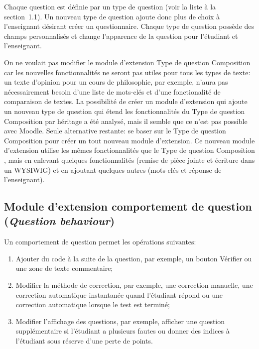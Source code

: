 Chaque question est définie par un type de question (voir la liste à la section~1.1).
Un nouveau type de question ajoute donc plus de choix à l'enseignant désirant créer un questionnaire.
Chaque type de question possède des champs personnalisés et change l'apparence de la question pour l'étudiant et l'enseignant.

On ne voulait pas modifier le module d'extension \og Type de question Composition \fg{} car les nouvelles fonctionnalités ne seront pas utiles pour tous les types de texte: un texte d'opinion pour un cours de philosophie, par exemple, n'aura pas n\'ecessairement besoin d'une liste de mots-clés et d'une fonctionalit\'e de comparaison de textes.
La possibilité de créer un module d'extension qui ajoute un nouveau type de question qui étend les fonctionnalités du \og Type de question Composition \fg{} par héritage a été analysé, mais il semble que ce n'est pas possible avec Moodle.
Seule alternative restante: se baser sur le \og Type de question Composition \fg{} pour créer un tout nouveau module d'extension.
Ce nouveau module d'extension utilise les mêmes fonctionnalités que le \og Type de question Composition \fg{}, mais en enlevant quelques fonctionnalités (remise de pièce jointe et écriture dans un WYSIWIG) et en ajoutant quelques autres (mots-clés et réponse de l'enseignant).

\subsection{Module d'extension comportement de question (\textit{Question behaviour})}

Un comportement de question permet les op\'erations suivantes:
\begin{enumerate}
  \item Ajouter du code à la suite de la question, par exemple, un bouton \og Vérifier \fg{} ou une zone de texte commentaire;
  
  \item Modifier la méthode de correction, par exemple, une correction manuelle, une correction automatique instantanée quand l'étudiant répond ou une correction automatique lorsque le test est terminé;
  
  \item Modifier l'affichage des questions, par exemple, afficher une question supplémentaire si l'étudiant a plusieurs fautes ou donner des indices à l'étudiant sous r\'eserve d'une perte de points.
\end{enumerate}

